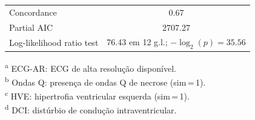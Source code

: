 \begin{table}[htbp]
{\begin{tabular}{lcccccc}
			\midrule
			Concordance                & \multicolumn{6}{c}{0.67}                                                                                         \\
			Partial AIC                & \multicolumn{6}{c}{2707.27}                                                                                      \\
			Log-likelihood ratio test  & \multicolumn{6}{c}{76.43 em 12 g.l.; $-\log_2(p)=35.56$}                                                         \\
			\bottomrule
		\end{tabular}%
	}
	\begin{flushleft}
		\footnotesize
		\textsuperscript{a} ECG-AR: ECG de alta resolução disponível.\\
		\textsuperscript{b} Ondas Q: presença de ondas Q de necrose (sim\,=\,1).\\
		\textsuperscript{c} HVE: hipertrofia ventricular esquerda (sim\,=\,1).\\
		\textsuperscript{d} DCI: distúrbio de condução intraventricular.
	\end{flushleft}
\end{table}

